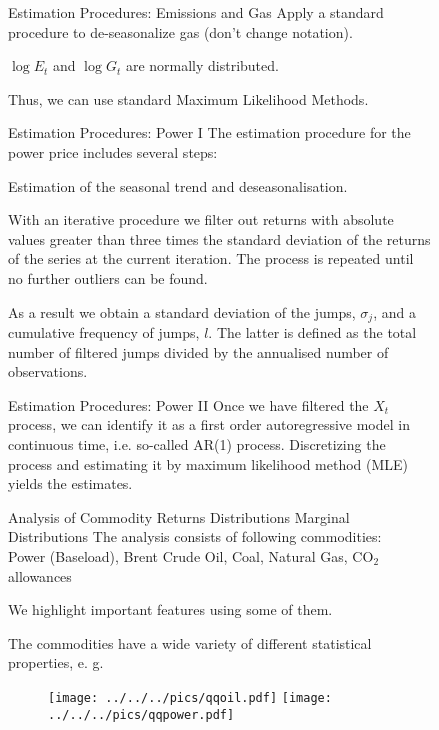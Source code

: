 \begin{figure}[htp]
Estimation Procedures: Emissions and Gas 
	Apply a standard procedure to de-seasonalize gas (don't change notation). 

	$\log E_{t}$ and $\log G_{t}$ are normally distributed. 

	Thus, we can use standard Maximum Likelihood Methods. 


Estimation Procedures: Power I 
	The estimation procedure for the power price includes several steps: 

	Estimation of the seasonal trend and deseasonalisation. 

	With an iterative procedure we filter out returns with absolute values
	greater than three times the standard deviation of the returns of
	the series at the current iteration. The process is repeated until
	no further outliers can be found. 

	As a result we obtain a standard deviation of the jumps, $\sigma_{j}$,
	and a cumulative frequency of jumps, $l$. The latter is defined as
	the total number of filtered jumps divided by the annualised number
	of observations. 


Estimation Procedures: Power II 
	Once we have filtered the $X_{t}$ process, we can identify it as
	a first order autoregressive model in continuous time, i.e. so-called
	AR(1) process. Discretizing the process and estimating it by maximum
	likelihood method (MLE) yields the estimates. 





\sectionEmpirical Analysis of Commodity Returns \subsectionMarginal Distributions
Marginal Distributions %
The analysis consists of following commodities:\\
 Power (Baseload), Brent Crude Oil, Coal, Natural Gas, CO$_{2}$ allowances

We highlight important features using some of them.

The commodities have a wide variety of different statistical properties,
e. g. 

\begin{center}
\begin{figure}
\texttt{[image: ../../../pics/qqoil.pdf]}
\texttt{[image: ../../../pics/qqpower.pdf]} 
\end{figure}


\end{center}
\end{figure}

